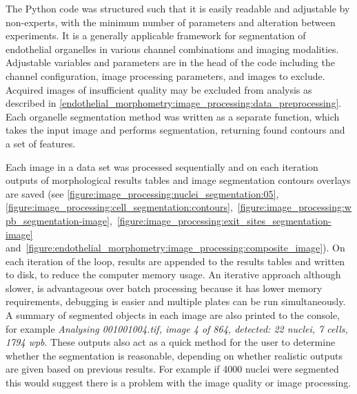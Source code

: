 The Python code was structured such that it is easily readable and adjustable by non-experts, with the minimum number of parameters and alteration between experiments. It is a generally applicable framework for segmentation of endothelial organelles in various channel combinations and imaging modalities. Adjustable variables and parameters are in the head of the code including the channel configuration, image processing parameters, and images to exclude. Acquired images of insufficient quality may be excluded from analysis as described in \autoref{endothelial_morphometry:image_processing:data_preprocessing}. Each organelle segmentation method was written as a separate function, which takes the input image and performs segmentation, returning found contours and a set of features.


Each image in a data set was processed sequentially and on each iteration outputs of morphological results tables and image segmentation contours overlays are saved (see \autoref{figure:image_processing:nuclei_segmentation:05}, \autoref{figure:image_processing:cell_segmentation:contours},~\autoref{figure:image_processing:wpb_segmentation-image},~\autoref{figure:image_processing:exit_sites_segmentation-image} and~\autoref{figure:endothelial_morphometry:image_processing:composite_image}). On each iteration of the loop, results are appended to the results tables and written to disk, to reduce the computer memory usage. An iterative approach although slower, is advantageous over batch processing because it has lower memory requirements, debugging is easier and multiple plates can be run simultaneously. A summary of segmented objects in each image are also printed to the console, for example \emph{Analysing 001001004.tif, image 4 of 864, detected: 22 nuclei, 7 cells, 1794 wpb}. These outputs also act as a quick method for the user to determine whether the segmentation is reasonable, depending on whether realistic outputs are given based on previous results. For example if 4000 nuclei were segmented this would suggest there is a problem with the image quality or image processing.


